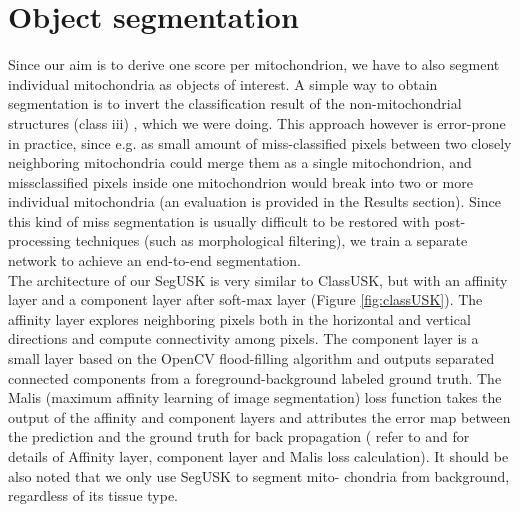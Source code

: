 \section{Object segmentation}
Since our aim is to derive one score per mitochondrion, we have to also segment
individual mitochondria as objects of interest. A simple way to obtain segmentation is
to invert the classification result of the non-mitochondrial structures (class iii) , which we were doing. This
approach however is error-prone in practice, since e.g. as small amount of
miss-classified pixels between two closely neighboring mitochondria could merge
them as a single mitochondrion, and missclassified pixels inside one mitochondrion
would break into two or more individual mitochondria (an evaluation is provided in
the Results section). Since this kind of miss
segmentation is usually difficult to be
restored with post-processing techniques (such as morphological filtering), we train a
separate network to achieve an end-to-end segmentation. \\
The architecture of our SegUSK is very similar to ClassUSK, but with an affinity
layer and a component layer after soft-max layer (Figure \ref{fig:classUSK}). The affinity layer explores
neighboring pixels both in the horizontal and vertical directions and compute
connectivity among pixels. The component layer is a small layer based on the
OpenCV flood-filling algorithm and outputs separated connected components from a
foreground-background labeled ground truth. The Malis (maximum affinity learning
of image segmentation) loss function takes the output of the affinity and component
layers and attributes the error map between the prediction and the ground truth for
back propagation ( refer to \cite{DBLP:journals/corr/Tschopp15} and \cite{DBLP:journals/corr/abs-0911-5372} for details of Affinity layer, component layer
and Malis loss calculation). 
It should be also noted that we only use SegUSK to segment mito-
chondria from background, regardless of its tissue type.

